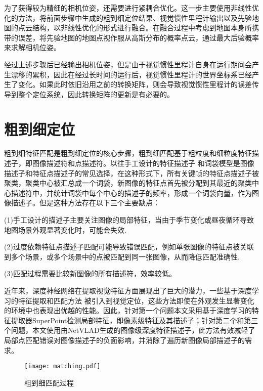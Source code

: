 为了获得较为精细的相机位姿，还需要进行紧耦合优化。这一步主要使用非线性优化的方法，将前面步骤中生成的粗到细定位结果、视觉惯性里程计输出以及先验地图的点云结构，以非线性优化的形式进行融合。在融合过程中考虑到地图本身所携带的误差，将先验地图的地图点视作服从高斯分布的概率点云，通过最大后验概率来求解相机位姿。

经过上述步骤后已经输出相机位姿，但是由于视觉惯性里程计自身在运行期间会产生漂移的累积，因此在经过长时间的运行后，视觉惯性里程计的世界坐标系已经产生了变化。如果此时依旧沿用之前的转换矩阵，则会导致视觉惯性里程计的误差传导到整个定位系统，因此转换矩阵的更新是有必要的。


\section{粗到细定位}

粗到细特征匹配是粗到细定位的核心步骤，粗到细匹配基于粗粒度和细粒度特征描述子，即图像描述符和点描述符。以往手工设计的特征描述子 \cite{lowe2004distinctive, rublee2011orb}和词袋模型是图像描述子和特征点描述子的常见选择，在这种形式下，所有关键帧的特征点描述子被聚类，聚类中心被汇总成一个词袋，新图像的特征点首先被分配到其最近的聚类中心描述符中，并统计词袋中每个中心的描述子的频率，形成一个词袋向量，作为图像描述子。但是这种方法存在以下三个主要缺点：

(1)手工设计的描述子主要关注图像的局部特征，当由于季节变化或昼夜循环导致地图场景外观显著变化时，可能会失效.

(2)过度依赖特征点描述子匹配可能导致错误匹配，例如单张图像的特征点被关联到多个场景，或多个场景中的点被匹配到同一张图像，从而降低匹配准确性.

(3)匹配过程需要比较新图像的所有描述符，效率较低。

近年来，深度神经网络在提取视觉特征方面展现出了巨大的潜力，一些基于深度学习的特征提取和匹配方法 \cite{detone2018superpoint, arandjelovic2016netvlad, sarlin2020superglue} 被引入到视觉定位，这些方法即使在外观发生显著变化的环境中也表现出优越的性能。因此，针对第一个问题本文采用基于深度学习的特征提取器SuperPoint\cite{detone2018superpoint}检测局部特征，即像素级特征及其描述子；针对第二个和第三个问题，本文使用由NetVLAD\cite{arandjelovic2016netvlad}生成的图像级深度特征描述子，此方法有效减轻了局部点匹配错误对图像描述子的负面影响，并消除了遍历新图像局部描述子的需求。

\begin{figure}
  \centering
  \texttt{[image: matching.pdf]}
  \caption{粗到细匹配过程}
  \label{fig:matching}
\end{figure}

